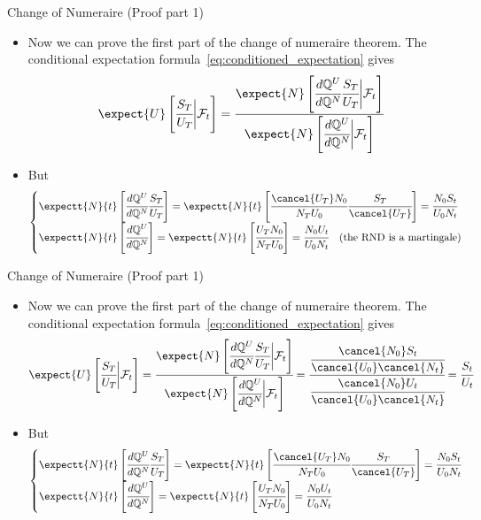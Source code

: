\documentclass{beamer}
\begin{document}
\begin{frame}{Change of Numeraire (Proof part 1)}
  \begin{itemize}
  \item<1-> Now we can prove the first part of the change of numeraire theorem. The conditional expectation formula~\cref{eq:conditioned_expectation} gives
    \begin{equation*}
      \expect{U}\left[\cfrac{S_T}{U_T}\bigg|\mathcal{F}_t\right]=\cfrac{\expect{N}\left[\cfrac{d\mathbb{Q}^U}{d\mathbb{Q}^N}\cfrac{S_T}{U_T}\bigg|\mathcal{F}_t\right]}{\expect{N}\left[\cfrac{d\mathbb{Q}^U}{d\mathbb{Q}^N}\bigg|\mathcal{F}_t\right]}
    \end{equation*}
  \item<2-> But 
    \begin{equation*}
      \begin{cases}
	\expectt{N}{t}\left[\cfrac{d\mathbb{Q}^U}{d\mathbb{Q}^N}\cfrac{S_T}{U_T}\right]= \expectt{N}{t}\left[\cfrac{\cancel{U_T} N_0}{N_T U_0}\cfrac{S_T}{\cancel{U_T}}\right]=\cfrac{N_0 S_t}{U_0 N_t} \\
	\expectt{N}{t}\left[\cfrac{d\mathbb{Q}^U}{d\mathbb{Q}^N}\right]= \expectt{N}{t}\left[\cfrac{U_T N_0}{N_T U_0}\right] = \cfrac{N_0 U_t}{U_0 N_t}\quad\text{(the RND is a martingale)}
      \end{cases}
    \end{equation*}
  \end{itemize}
\end{frame}	

\begin{frame}{Change of Numeraire (Proof part 1)}
	\begin{itemize}
		\item Now we can prove the first part of the change of numeraire theorem. The conditional expectation formula~\cref{eq:conditioned_expectation} gives
		\begin{equation*}
			\expect{U}\left[\cfrac{S_T}{U_T}\bigg|\mathcal{F}_t\right]=\cfrac{\expect{N}\left[\cfrac{d\mathbb{Q}^U}{d\mathbb{Q}^N}\cfrac{S_T}{U_T}\bigg|\mathcal{F}_t\right]}{\expect{N}\left[\cfrac{d\mathbb{Q}^U}{d\mathbb{Q}^N}\bigg|\mathcal{F}_t\right]} = \cfrac{\cfrac{\cancel{N_0} S_t}{\cancel{U_0} \cancel{N_t}}}{\cfrac{\cancel{N_0} U_t}{\cancel{U_0} \cancel{N_t}}} = \cfrac{S_t}{U_t}
		\end{equation*}
		\item But 
		\begin{equation*}
			\begin{cases}
				\expectt{N}{t}\left[\cfrac{d\mathbb{Q}^U}{d\mathbb{Q}^N}\cfrac{S_T}{U_T}\right]= \expectt{N}{t}\left[\cfrac{\cancel{U_T} N_0}{N_T U_0}\cfrac{S_T}{\cancel{U_T}}\right]=\cfrac{N_0 S_t}{U_0 N_t} \\
				\expectt{N}{t}\left[\cfrac{d\mathbb{Q}^U}{d\mathbb{Q}^N}\right]= \expectt{N}{t}\left[\cfrac{U_T N_0}{N_T U_0}\right] = \cfrac{N_0 U_t}{U_0 N_t}
			\end{cases}
		\end{equation*}
	\end{itemize}
\myendproof
\end{frame}	
\end{document}
